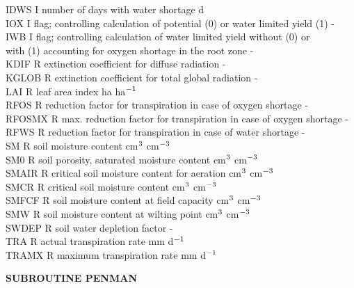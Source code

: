 \documentclass[11pt]{article}
\begin{document}
\begin{tabbing}
IDWS\> \> I\> number of days with water shortage\> \> \> \> \> \> \> d\\
IOX\> \> I\> flag; controlling calculation of potential (0) or water limited yield (1) \> \> \> \> \> \> \> -\\
IWB\> \> I\> flag; controlling calculation of water limited yield without (0) or \\
\>\> \> with (1) accounting for oxygen shortage in the root zone\> \> \> \> \> \> \> -\\
KDIF\> \> R\> extinction coefficient for diffuse radiation\> \> \> \> \> \> \> -\\
KGLOB\> \> R\> extinction coefficient for total global radiation\> \> \> \> \> \> \> -\\
LAI\> \> R\> leaf area index\> \> \> \> \> \> \> ha ha$^{{\rm -1}}$\\
RFOS\> \> R\> reduction factor for transpiration in case of oxygen shortage\> \> \> \> \> \> \> -\\
RFOSMX\> \> R\> max. reduction factor for transpiration in case of oxygen shortage\> \> \> \> \> \> \> -\\
RFWS\> \> R\> reduction factor for transpiration in case of water shortage\> \> \> \> \> \> \> -\\
SM\> \> R\> soil moisture content\> \> \> \> \> \> \> cm$^{{\rm 3}}$ cm$^{{\rm -3}}$\\
SM0\> \> R\> soil porosity, saturated moisture content \> \> \> \> \> \> \> cm$^{{\rm 3}}$ cm$^{{\rm -3}}$\\
SMAIR\> \> R\> critical soil moisture content for aeration\> \> \> \> \> \> \> cm$^{{\rm 3}}$ cm$^{{\rm -3}}$\\
SMCR\> \> R \> critical soil moisture content\> \> \> \> \> \> \> cm$^{{\rm 3}}$ cm$^{{\rm -3}}$\\
SMFCF\> \> R\> soil moisture content at field capacity\> \> \> \> \> \> \> cm$^{{\rm 3}}$ cm$^{{\rm -3}}$\\
SMW\> \> R \> soil moisture content at wilting point\> \> \> \> \> \> \> cm$^{{\rm 3}}$ cm$^{{\rm -3}}$\\
SWDEP\> \> R\> soil water depletion factor\> \> \> \> \> \> \> -\\
TRA\> \> R\> actual transpiration rate\> \> \> \> \> \> \> mm d$^{{\rm -1}}$\\
TRAMX\> \> R\> maximum transpiration rate\> \> \> \> \> \> \> mm d$^{{\rm -1}}$
\end{tabbing}

\bigskip
\bigskip
\bigskip
\bigskip
{\bf SUBROUTINE PENMAN}
\testlastline
\end{document}

